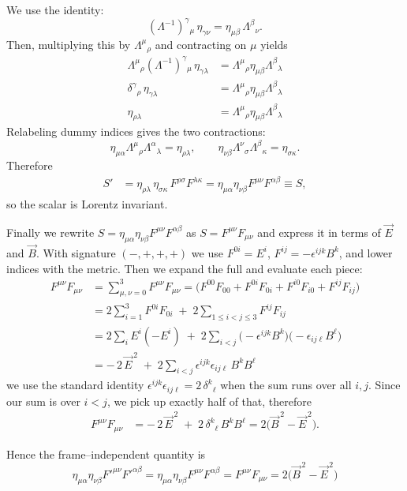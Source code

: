 \documentclass[12pt]{article}
\begin{document}
\begin{enumerate}
  We use the identity:
  \[
  (\Lambda^{-1})^{\gamma}{}_{\mu}\,\eta_{\gamma\nu}=\eta_{\mu\beta}\,\Lambda^{\beta}{}_{\nu}.
  \]
  Then, multiplying this by $\Lambda^{\mu}{}_{\rho}$ and contracting on $\mu$ yields
  \[
  \begin{aligned}
  \Lambda^{\mu}{}_{\rho}(\Lambda^{-1})^{\gamma}{}_{\mu}\,\eta_{\gamma\lambda}
  &=\Lambda^{\mu}{}_{\rho}\eta_{\mu\beta}\Lambda^{\beta}{}_{\lambda}\\
  \delta^{\gamma}{}_{\rho}\,\eta_{\gamma\lambda}
  &=\Lambda^{\mu}{}_{\rho}\eta_{\mu\beta}\Lambda^{\beta}{}_{\lambda}\\
  \eta_{\rho\lambda}
  &=\Lambda^{\mu}{}_{\rho}\eta_{\mu\beta}\Lambda^{\beta}{}_{\lambda}
  \end{aligned}
  \]
  Relabeling dummy indices gives the two contractions:
  \[
  \eta_{\mu\alpha}\Lambda^{\mu}{}_{\rho}\Lambda^{\alpha}{}_{\lambda}=\eta_{\rho\lambda},
  \qquad
  \eta_{\nu\beta}\Lambda^{\nu}{}_{\sigma}\Lambda^{\beta}{}_{\kappa}=\eta_{\sigma\kappa}.
  \]
  Therefore
  \[
  \begin{aligned}
  S'
  &=\eta_{\rho\lambda}\,\eta_{\sigma\kappa}\,F^{\rho\sigma}F^{\lambda\kappa}
  =\eta_{\mu\alpha}\eta_{\nu\beta}F^{\mu\nu}F^{\alpha\beta}
  \equiv S,
  \end{aligned}
  \]
  so the scalar is Lorentz invariant.
  
  Finally we rewrite $S=\eta_{\mu\alpha}\eta_{\nu\beta}F^{\mu\nu}F^{\alpha\beta}$ as $S=F^{\mu\nu}F_{\mu\nu}$ and express it in terms of $\vec E$ and $\vec B$. 
  With signature $(-,+,+,+)$ we use 
  $F^{0i}=E^i$, $F^{ij}=-\epsilon^{ijk}B^k$, and lower indices with the metric. Then we expand the full and evaluate each piece:
  \[
  \begin{aligned}
  F^{\mu\nu}F_{\mu\nu}
  &=\sum_{\mu,\nu=0}^{3} F^{\mu\nu}F_{\mu\nu}
  = \Big( F^{00}F_{00} + F^{0i}F_{0i} + F^{i0}F_{i0} + F^{ij}F_{ij} \Big) \\[2pt]
  &= 2\sum_{i=1}^{3} F^{0i}F_{0i} \;+\; 2\sum_{1\le i<j\le 3} F^{ij}F_{ij}
  \quad\\[4pt]
  &= 2\sum_i E^i(-E^i) \;+\; 2\sum_{i<j} \bigl(-\epsilon^{ijk}B^k\bigr)\bigl(-\epsilon_{ij\ell}B^\ell\bigr) \\[2pt]
  &= -\,2\,\vec E^{\,2} \;+\; 2\sum_{i<j}\epsilon^{ijk}\epsilon_{ij\ell}\,B^k B^\ell
  \end{aligned}
  \]
  we use the standard identity 
  $\epsilon^{ijk}\epsilon_{ij\ell}=2\,\delta^{k}{}_{\ell}$ when the sum runs over all $i,j$. Since our sum is over $i<j$, we pick up exactly half of that, therefore
  \[
  \begin{aligned}
  F^{\mu\nu}F_{\mu\nu}
  &= -\,2\,\vec E^{\,2} \;+\; 2\,\delta^{k}{}_{\ell}\,B^k B^\ell
  = 2\bigl(\vec B^{\,2}-\vec E^{\,2}\bigr).
  \end{aligned}
  \]

  
  Hence the frame–independent quantity is
  \[
  \boxed{\;
  \eta_{\mu\alpha}\eta_{\nu\beta}F'^{\mu\nu}F'^{\alpha\beta}
  =\eta_{\mu\alpha}\eta_{\nu\beta}F^{\mu\nu}F^{\alpha\beta}
  =F^{\mu\nu}F_{\mu\nu}
  =2\bigl(\vec B^{\,2}-\vec E^{\,2}\bigr)\; }
  \]
  


\end{enumerate}
\end{document}
